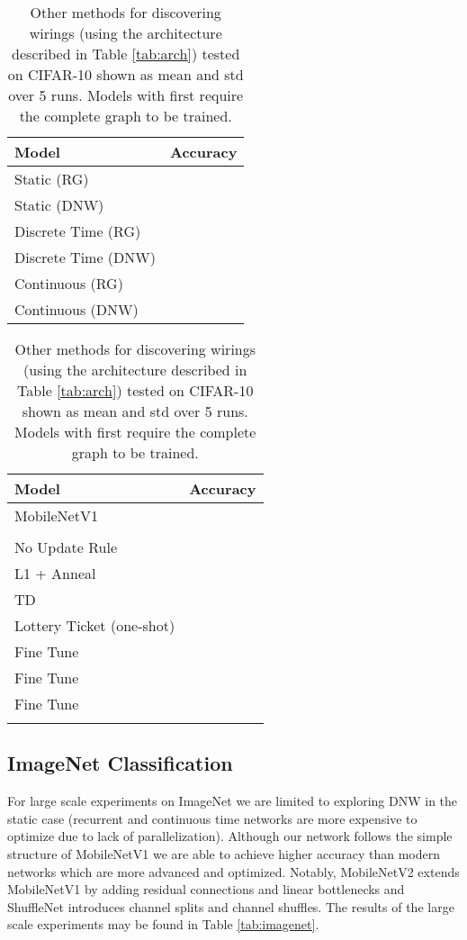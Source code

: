 \documentclass{article}
\newcommand*{\smn}{\text{MobileNetV1-DNW}}
\newcommand*{\rg}{\text{MobileNetV1-RG}}
\begin{document}
\begin{table}
\parbox{.45\linewidth}{
  \small
  \caption{Testing a tiny (41k parameters) classifier on CIFAR-10 \cite{cifar} in static and dynamic settings shown as mean and standard deviation (std) over 5 runs.}
  \label{tab:small-scale}
  \centering
  \begin{tabular}{ll}
    \toprule
    Model  & Accuracy \\
    \midrule
    Static (RG) &  \\
    Static (DNW) &  \\
    \midrule
    Discrete Time (RG) &  \\
    Discrete Time (DNW) &  \\
    \midrule
    Continuous (RG) &  \\
    Continuous (DNW) &  \\
    \bottomrule
  \end{tabular}
 } \hspace{1cm}
\parbox{.45\linewidth}{
  \small
  \caption{Other methods for discovering wirings (using the architecture described in Table \ref{tab:arch}) tested on CIFAR-10 shown as mean and std over 5 runs. Models with  first require the complete graph to be trained.}
  \label{tab:net}
  \centering
  \begin{tabular}{ll}
    \toprule
    Model      & Accuracy \\
    \midrule
    MobileNetV1   &      \\
    \rg  &      \\
    No Update Rule  &      \\
    L1 + Anneal  &      \\
    TD  &  \\
    Lottery Ticket (one-shot)  &      \\
    Fine Tune   &      \\
    Fine Tune   &      \\
    Fine Tune   &      \\
    \smn &  \\ 
    \bottomrule
  \end{tabular}
  }
  \vspace{-2em}
\end{table}
\subsection{ImageNet Classification}
For large scale experiments on ImageNet \cite{imagenet} we are limited to exploring DNW in the static case (recurrent and continuous time networks are more expensive to optimize due to lack of parallelization). Although our network follows the simple structure of MobileNetV1 \cite{mobilenetv1} we are able to achieve higher accuracy than modern networks which are more advanced and optimized. Notably, MobileNetV2 \cite{mobilenetv2} extends MobileNetV1 by adding residual connections and linear bottlenecks and ShuffleNet \cite{shufflenet, shufflenetv2} introduces channel splits and channel shuffles. The results of the large scale experiments may be found in Table \ref{tab:imagenet}.
\end{document}
